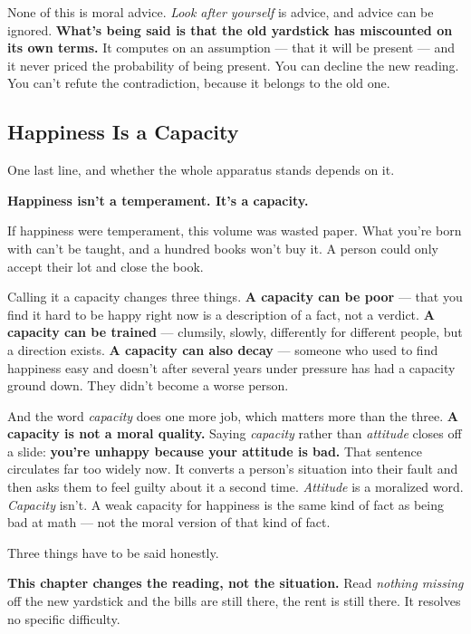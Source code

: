 \documentclass[11pt,a4paper]{article}
\begin{document}
None of this is moral advice. \textit{Look after yourself} is advice, and advice can be ignored. \textbf{What's being said is that the old yardstick has miscounted on its own terms.} It computes on an assumption --- that it will be present --- and it never priced the probability of being present. You can decline the new reading. You can't refute the contradiction, because it belongs to the old one.

\subsection{Happiness Is a Capacity}

One last line, and whether the whole apparatus stands depends on it.

\textbf{Happiness isn't a temperament. It's a capacity.}

If happiness were temperament, this volume was wasted paper. What you're born with can't be taught, and a hundred books won't buy it. A person could only accept their lot and close the book.

Calling it a capacity changes three things. \textbf{A capacity can be poor} --- that you find it hard to be happy right now is a description of a fact, not a verdict. \textbf{A capacity can be trained} --- clumsily, slowly, differently for different people, but a direction exists. \textbf{A capacity can also decay} --- someone who used to find happiness easy and doesn't after several years under pressure has had a capacity ground down. They didn't become a worse person.

And the word \textit{capacity} does one more job, which matters more than the three. \textbf{A capacity is not a moral quality.} Saying \textit{capacity} rather than \textit{attitude} closes off a slide: \textbf{you're unhappy because your attitude is bad.} That sentence circulates far too widely now. It converts a person's situation into their fault and then asks them to feel guilty about it a second time. \textit{Attitude} is a moralized word. \textit{Capacity} isn't. A weak capacity for happiness is the same kind of fact as being bad at math --- not the moral version of that kind of fact.

Three things have to be said honestly.

\textbf{This chapter changes the reading, not the situation.} Read \textit{nothing missing} off the new yardstick and the bills are still there, the rent is still there. It resolves no specific difficulty.
\end{document}
